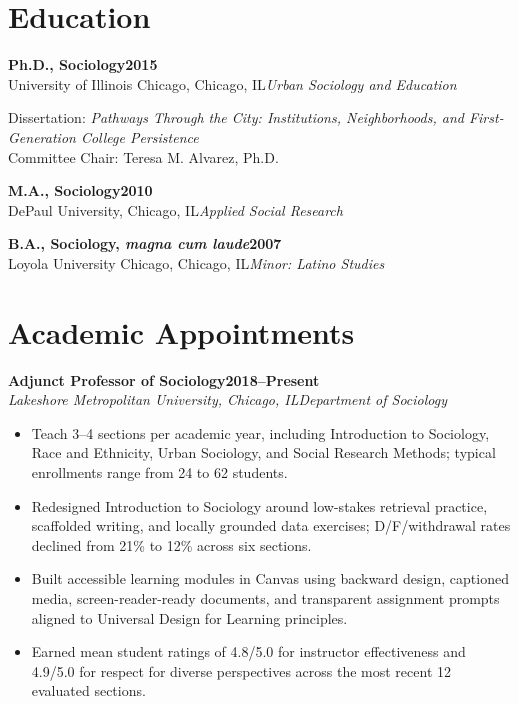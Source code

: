\documentclass[10pt,letterpaper]{article}
\newcommand{\appointment}[4]{%
  \Needspace{5\baselineskip}%
  \textbf{\color{Navy}#1}\hfill\textbf{#2}\\[-1pt]
  \textit{#3}\hfill\textit{\color{Muted}#4}\par
}
\newcommand{\degree}[4]{%
  \Needspace{3\baselineskip}%
  \textbf{\color{Navy}#1}\hfill\textbf{#2}\\[-1pt]
  #3\hfill\textit{\color{Muted}#4}\par
}
\begin{document}
\section*{Education}

\degree{Ph.D., Sociology}{2015}{University of Illinois Chicago, Chicago, IL}{Urban Sociology and Education}
\vspace{3pt}
Dissertation: \textit{Pathways Through the City: Institutions, Neighborhoods, and First-Generation College Persistence}\\[-1pt]
Committee Chair: Teresa M. Alvarez, Ph.D.

\vspace{5pt}
\degree{M.A., Sociology}{2010}{DePaul University, Chicago, IL}{Applied Social Research}
\vspace{3pt}
\degree{B.A., Sociology, \textit{magna cum laude}}{2007}{Loyola University Chicago, Chicago, IL}{Minor: Latino Studies}

\section*{Academic Appointments}

\appointment{Adjunct Professor of Sociology}{2018--Present}{Lakeshore Metropolitan University, Chicago, IL}{Department of Sociology}
\begin{itemize}
  \item Teach 3--4 sections per academic year, including Introduction to Sociology, Race and Ethnicity, Urban Sociology, and Social Research Methods; typical enrollments range from 24 to 62 students.
  \item Redesigned Introduction to Sociology around low-stakes retrieval practice, scaffolded writing, and locally grounded data exercises; D/F/withdrawal rates declined from 21\% to 12\% across six sections.
  \item Built accessible learning modules in Canvas using backward design, captioned media, screen-reader-ready documents, and transparent assignment prompts aligned to Universal Design for Learning principles.
  \item Earned mean student ratings of 4.8/5.0 for instructor effectiveness and 4.9/5.0 for respect for diverse perspectives across the most recent 12 evaluated sections.
\end{itemize}
\end{document}
